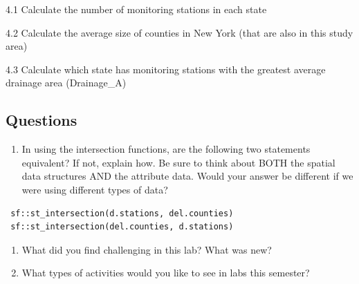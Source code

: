 \documentclass[]{article}
\providecommand{\tightlist}{%
  \setlength{\itemsep}{0pt}\setlength{\parskip}{0pt}}
\begin{document}
4.1 Calculate the number of monitoring stations in each state

4.2 Calculate the average size of counties in New York (that are also in
this study area)

4.3 Calculate which state has monitoring stations with the greatest
average drainage area (Drainage\_A)

\hypertarget{questions}{%
\subsection{Questions}\label{questions}}

\begin{enumerate}
\def\labelenumi{\arabic{enumi}.}
\tightlist
\item
  In using the intersection functions, are the following two statements
  equivalent? If not, explain how. Be sure to think about BOTH the
  spatial data structures AND the attribute data. Would your answer be
  different if we were using different types of data?
\end{enumerate}

\begin{verbatim}
 sf::st_intersection(d.stations, del.counties)
 sf::st_intersection(del.counties, d.stations)
\end{verbatim}

\begin{enumerate}
\def\labelenumi{\arabic{enumi}.}
\setcounter{enumi}{1}
\item
  What did you find challenging in this lab? What was new?
\item
  What types of activities would you like to see in labs this semester?
\end{enumerate}
\end{document}

